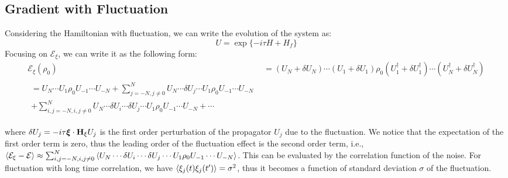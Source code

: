 \documentclass{notes2}
\begin{document}
\subsection{Gradient with Fluctuation}
Considering the Hamiltonian with fluctuation, we can write the evolution of the system as:
\begin{equation}
    U = \exp\{-i\tau H + H_f\}
\end{equation}
Focusing on $\mathcal{E}_\xi$, we can write it as the following form:
\begin{align}
    \mathcal{E}_\xi(\rho_0) &= (U_N + \delta U_N) \cdots (U_1 + \delta U_1) \rho_0 (U_1^\dagger + \delta U_1^\dagger) \cdots (U_N^\dagger + \delta U_N^\dagger)\\
    \begin{split}
    = U_N \cdots U_1 \rho_0 U_{-1} \cdots U_{-N} + \sum_{j=-N, j\neq 0}^N U_N \cdots \delta U_j \cdots U_1 \rho_0 U_{-1} \cdots U_{-N} \\
    + \sum_{i,j=-N, i,j\neq 0}^N U_N \cdots \delta U_i \cdots \delta U_j \cdots U_1 \rho_0 U_{-1} \cdots U_{-N} + \cdots
    \end{split}\label{eq:fluc_expansion_E}
\end{align}

where $\delta U_j = -i\tau\vb*\xi\cdot \vb H_{\xi}U_j$ is the first order perturbation of the propagator $U_j$ due to the fluctuation.
We notice that the expectation of the first order term is zero, thus the leading order of the fluctuation effect is the second order term, i.e., $\expval{\mathcal{E}_\xi - \mathcal{E}} \approx \sum_{i,j=-N, i,j\neq 0}^N \expval{U_N \cdots \delta U_i \cdots \delta U_j \cdots U_1 \rho_0 U_{-1} \cdots U_{-N}}$. This can be evaluated by the correlation function of the noise. For fluctuation with long time correlation, we have $\expval{\xi_j(t)\xi_j(t')} = \sigma^2$, thus it becomes a function of standard deviation $\sigma$ of the fluctuation.
\end{document}
